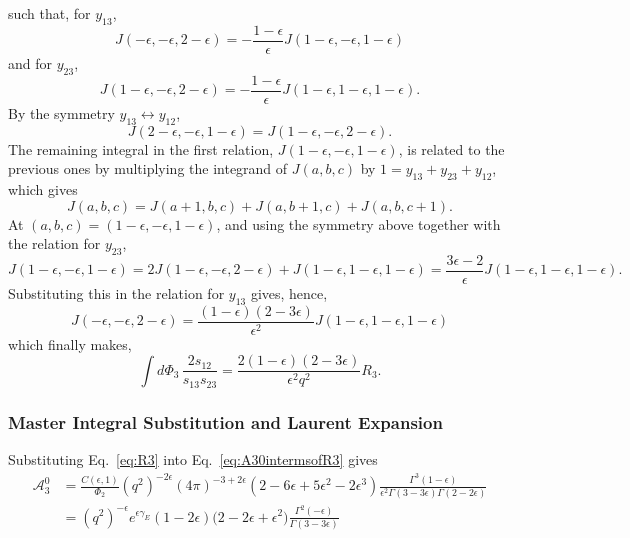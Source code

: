 such that, for $y_{13}$,
\begin{equation}   
    J(-\epsilon,-\epsilon,2-\epsilon) = -\frac{1-\epsilon}{\epsilon}J(1-\epsilon,-\epsilon,1-\epsilon)
\end{equation}
and for $y_{23}$,
\begin{equation}
    J(1-\epsilon,-\epsilon,2-\epsilon) = -\frac{1-\epsilon}{\epsilon}J(1-\epsilon,1-\epsilon,1-\epsilon).
\end{equation}
By the symmetry $y_{13}\leftrightarrow y_{12}$,
\begin{equation}
J(2-\epsilon,-\epsilon,1-\epsilon)
=
J(1-\epsilon,-\epsilon,2-\epsilon).
\end{equation}
The remaining integral in the first relation, $J(1-\epsilon,-\epsilon,1-\epsilon)$, is related to the previous ones by
multiplying the integrand of $J(a,b,c)$ by $1=y_{13}+y_{23}+y_{12}$, which gives
\begin{equation}
    J(a,b,c) = J(a+1,b,c)+J(a,b+1,c)+J(a,b,c+1).
\end{equation}
At $(a,b,c)=(1-\epsilon,-\epsilon,1-\epsilon)$, and using the symmetry above together with the relation for $y_{23}$,
\begin{equation}
    J(1-\epsilon,-\epsilon,1-\epsilon) = 2J(1-\epsilon,-\epsilon,2-\epsilon)+J(1-\epsilon,1-\epsilon,1-\epsilon)
    = \frac{3\epsilon-2}{\epsilon}J(1-\epsilon,1-\epsilon,1-\epsilon).
\end{equation}
Substituting this in the relation for $y_{13}$ gives, hence,
\begin{equation}
    J(-\epsilon,-\epsilon,2-\epsilon) = \frac{(1-\epsilon)(2-3\epsilon)}{\epsilon^2}J(1-\epsilon,1-\epsilon,1-\epsilon)
\end{equation}
which finally makes,
\begin{equation}
    \int d\Phi_3\,\frac{2s_{12}}{s_{13}s_{23}} = \frac{2(1-\epsilon)(2-3\epsilon)}{\epsilon^2q^2}R_3.
\end{equation}

\subsubsection*{Master Integral Substitution and Laurent Expansion}

Substituting Eq.~\eqref{eq:R3} into Eq.~\eqref{eq:A30intermsofR3} gives
\begin{equation}\label{eq:A30withR30Sub}
    \begin{split}
        \mathcal A_3^0 &= \frac{C(\epsilon,1)}{\Phi_2}\left(q^2\right)^{-2\epsilon}(4\pi)^{-3+2\epsilon}(2-6\epsilon+5\epsilon^2-2\epsilon^3)\frac{\Gamma^3(1-\epsilon)}{\epsilon^2\Gamma(3-3\epsilon)\Gamma(2-2\epsilon)}\\
                       &= \left(q^2\right)^{-\epsilon}e^{\epsilon\gamma_E}(1-2\epsilon)\big(2-2\epsilon+\epsilon^2\big)\frac{\Gamma^2(-\epsilon)}{\Gamma(3-3\epsilon)}
    \end{split}
\end{equation}


